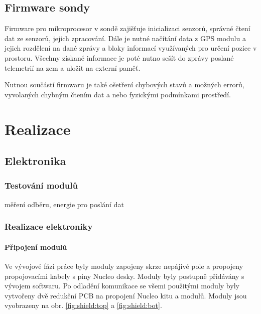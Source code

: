 \documentclass[twoside]{ctuthesis}
\theoremstyle{plain}
\theoremstyle{definition}
\theoremstyle{note}
\begin{document}
	\section{Firmware sondy}
	Firmware pro mikroprocesor v sondě zajišťuje inicializaci senzorů, správné čtení dat ze senzorů, jejich zpracování. Dále je nutné načítání data z GPS modulu a jejich rozdělení na dané zprávy a bloky informací využívaných pro určení pozice v prostoru. Všechny získané informace je poté nutno sešít do zprávy poslané telemetrií na zem a uložit na externí paměť. 

	Nutnou součástí firmwaru je také ošetření chybových stavů a možných errorů, vyvolaných chybným čtením dat a nebo fyzickými podmínkami prostředí.
	

\chapter{Realizace}

	\section{Elektronika}
		\subsection{Testování modulů}
		měření odběru, energie pro poslání dat

		\subsection{Realizace elektroniky}
		

		\subsubsection{Připojení modulů}
		Ve vývojové fázi práce byly moduly zapojeny skrze nepájivé pole a propojeny propojovacími kabely s piny Nucleo desky. Moduly byly postupně přidávány s vývojem softwaru. Po odladění komunikace se všemi použitými moduly byly vytvořeny dvě redukční PCB na propojení Nucleo kitu a modulů. Moduly jsou vyobrazeny na obr. \ref{fig:shield:top} a \ref{fig:shield:bot}. 
\end{document}
